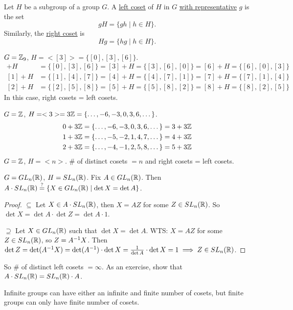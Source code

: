 \documentclass[]{article}
\begin{document}
\begin{definition}
	Let $H$ be a subgroup of a group $G$.
	A \ul{left coset} of $H$ in $G$ \ul{with representative} $g$ is the set $$gH = \{gh\mid h\in H\}.$$
	Similarly, the \ul{right coset} is $$Hg = \{hg\mid h\in H\}.$$
\end{definition}
\begin{example}
	$G = \mathbb{Z}_9$, $H = <[3]> = \{[0],[3],[6]\}$.
	\begin{align*}
		[0] + H &= \{[0],[3],[6]\} = [3] + H = \{[3],[6],[0]\} = [6] + H = \{[6],[0],[3]\} \\
		[1] + H &= \{[1],[4],[7]\} = [4] + H = \{[4],[7],[1]\} = [7] + H = \{[7],[1],[4]\} \\
		[2] + H &= \{[2],[5],[8]\} = [5] + H = \{[5],[8],[2]\} = [8] + H = \{[8],[2],[5]\}
	\end{align*}
	In this case, right cosets = left cosets.
\end{example}
\begin{example}
	$G = \mathbb{Z}$, $H = <3> = 3\mathbb{Z} = \{\dots,-6,-3,0,3,6,\dots\}$.
	\begin{align*}
		0 + 3\mathbb{Z} &= \{\dots,-6,-3,0,3,6,\dots\} = 3+3\mathbb{Z} \\
		1 + 3\mathbb{Z} &= \{\dots,-5,-2,1,4,7,\dots\} = 4+3\mathbb{Z} \\
		2 + 3\mathbb{Z} &= \{\dots,-4,-1,2,5,8,\dots\} = 5+3\mathbb{Z}
	\end{align*}
	$G = \mathbb{Z}$, $H = <n>$. \# of distinct cosets $=n$ and right cosets = left cosets.
\end{example}
\begin{example}
	$G = GL_n(\mathbb{R})$, $H = SL_n(\mathbb{R})$. Fix $A\in GL_n(\mathbb{R})$.
	Then $A\cdot SL_n(\mathbb{R}) \overset{?}{=} \{X\in GL_n(\mathbb{R})\mid\det X = \det A\}$.
	\begin{proof}
		\ul{$\subseteq$} Let $X\in A\cdot SL_n(\mathbb{R})$, then $X = AZ$ for some $Z\in SL_n(\mathbb{R})$. So $\det X = \det A \cdot \det Z = \det A\cdot 1$.
		
		\ul{$\supseteq$} Let $X\in GL_n(\mathbb{R})$ such that $\det X = \det A$.
		WTS: $X = AZ$ for some $Z\in SL_n(\mathbb{R})$, so $Z = A^{-1} X$.
		Then $\det Z = \det(A^{-1} X) = \det(A^{-1})\cdot \det X = \frac{1}{\det A}\cdot \det X = 1 \implies Z\in SL_n(\mathbb{R})$.
	\end{proof}
	So \# of distinct left cosets $=\infty$. As an exercise, show that $A\cdot SL_n(\mathbb{R}) = SL_n(\mathbb{R}) \cdot A$.
\end{example}
\begin{remark}
	Infinite groups can have either an infinite and finite number of cosets, but finite groups can only have finite number of cosets.
\end{remark}
\end{document}
